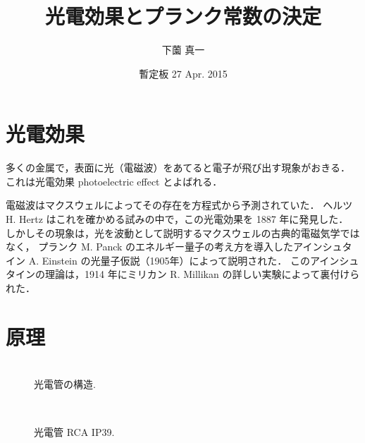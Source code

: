 \documentclass[11pt,sort]{jarticle}
\title{光電効果とプランク常数の決定}
\author{下薗 真一}
\date{暫定板 27 Apr. 2015}
\begin{document}
\maketitle

\section{光電効果}

多くの金属で，表面に光（電磁波）をあてると電子が飛び出す現象がおきる．
これは光電効果 photoelectric effect とよばれる．

電磁波はマクスウェルによってその存在を方程式から予測されていた．
ヘルツ H. Hertz はこれを確かめる試みの中で，この光電効果を 1887 年に発見した．
しかしその現象は，光を波動として説明するマクスウェルの古典的電磁気学ではなく，
プランク M. Panck のエネルギー量子の考え方を導入したアインシュタイン A. Einstein の光量子仮説（1905年）によって説明された．
このアインシュタインの理論は，1914 年にミリカン R. Millikan の詳しい実験によって裏付けられた．

\section{原理}

\begin{figure}[t]
\begin{minipage}[t]{.4\textwidth}
\begin{center}
\\
\caption{光電管の構造. }\label{fig:phototube} 
\end{center}
\end{minipage}
\hfill
\begin{minipage}[t]{.5\textwidth}
\begin{center}
\\
\caption{光電管 RCA IP39. }\label{fig:IP39} 
\end{center}
\end{minipage}
\end{figure}
\end{document}
